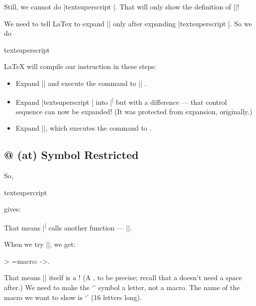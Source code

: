 Still, we cannot do \cil|\show\csname textsuperscript \endcsname|. That will only show the definition of \cil|\csname|!

We need to tell LaTex to expand \cil|\show| only after expanding \cil|\csname textsuperscript \endcsname|. So we do

\begin{codecfb}
\expandafter\show\csname textsuperscript \endcsname
\end{codecfb}

LaTeX will compile our instruction in these steps:

\begin{itemize}
  \item Expand \cil|\expandafter| and execute the command to  \cil|\show| .
  \item Expand \cil|\csname textsuperscript \endcsname| into \cil|\textsuperscript| but with a difference --- that control sequence can now be expanded! (It was protected from expansion, originally.)
  \item Expand \cil|\show|, which executes the command to .
\end{itemize}

\subsection{@ (at) Symbol Restricted}

So,

\begin{codecfb}
\expandafter\show\csname textsupercript \endcsname
\end{codecfb}

gives:


That means \cil|\textsuperscript| calls another function --- \cil|\@textsuperscript|.

When we try \cil|\show\@textsuperscript|, we get:

\begin{outputcfb}
> \@=macro:
->\spacefactor \@m {}.
\end{outputcfb}

That means \cil|\@| itself is a ! (A , to be precise; recall that a  doesn't need a space after.) We need to make the `' symbol a letter, not a macro. The name of the macro we want to show is `' (16 letters long).

